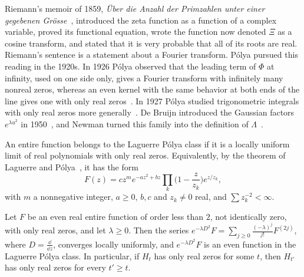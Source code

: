 Riemann's memoir of 1859, \emph{\"Uber die Anzahl der Primzahlen unter einer gegebenen Gr\"osse}~\cite{riemann1859}, introduced the zeta function as a function of a complex variable, proved its functional equation, wrote the function now denoted $\Xi$ as a cosine transform, and stated that it is very probable that all of its roots are real. Riemann's sentence is a statement about a Fourier transform. P\'olya pursued this reading in the 1920s. In 1926 P\'olya observed that the leading term of $\Phi$ at infinity, used on one side only, gives a Fourier transform with infinitely many nonreal zeros, whereas an even kernel with the same behavior at both ends of the line gives one with only real zeros~\cite{polya1926}. In 1927 P\'olya studied trigonometric integrals with only real zeros more generally~\cite{polya1927}. De Bruijn introduced the Gaussian factors $e^{\lambda u^2}$ in 1950~\cite{debruijn1950}, and Newman turned this family into the definition of $\Lambda$~\cite{newman1976}.

\begin{definition}\label{def:laguerrepolya}
An entire function belongs to the Laguerre P\'olya class if it is a locally uniform limit of real polynomials with only real zeros. Equivalently, by the theorem of Laguerre and P\'olya~\cite[Chapter~VIII]{levin1964}, it has the form
\[
F(z) = cz^me^{-az^2+bz}\prod_k\Big(1-\frac{z}{z_k}\Big)e^{z/z_k},
\]
with $m$ a nonnegative integer, $a\geq0$, $b,c$ and $z_k\neq0$ real, and $\sum z_k^{-2}<\infty$.
\end{definition}

\begin{theorem}\label{thm:polyadebruijn}
Let $F$ be an even real entire function of order less than $2$, not identically zero, with only real zeros, and let $\lambda\geq0$. Then the series $e^{-\lambda D^2}F = \sum_{j\geq0}\frac{(-\lambda)^j}{j!}F^{(2j)}$, where $D = \frac{\dd}{\dd z}$, converges locally uniformly, and $e^{-\lambda D^2}F$ is an even function in the Laguerre P\'olya class. In particular, if $H_t$ has only real zeros for some $t$, then $H_{t'}$ has only real zeros for every $t'\geq t$.
\end{theorem}

